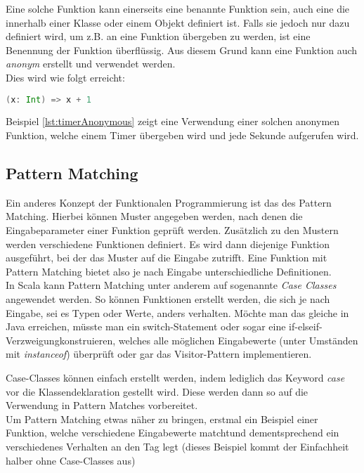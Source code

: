 Eine solche Funktion kann einerseits eine benannte Funktion sein, auch
eine die innerhalb einer Klasse oder einem Objekt definiert ist.  Falls
sie jedoch nur dazu definiert wird, um z.B. an eine Funktion übergeben
zu werden, ist eine Benennung der Funktion überflüssig. Aus diesem Grund
kann eine Funktion auch \emph{anonym} erstellt und verwendet werden.\\

Dies wird wie folgt erreicht: 

\begin{lstlisting}[float=ht,language=scala,caption=Anonyme Funktion,label=lst:anonymousFunction]
(x: Int) => x + 1
\end{lstlisting}

Beispiel \ref{lst:timerAnonymous} zeigt eine Verwendung einer solchen 
anonymen Funktion, welche einem Timer übergeben wird und jede Sekunde
aufgerufen wird. \\

\subsection{Pattern Matching}
\label{sec:patternMatching}

Ein anderes Konzept der Funktionalen Programmierung ist das des Pattern
Matching. Hierbei können Muster angegeben werden, nach denen die
Eingabeparameter einer Funktion geprüft werden. Zusätzlich zu den
Mustern werden verschiedene Funktionen definiert. Es wird dann diejenige
Funktion ausgeführt, bei der das Muster auf die Eingabe zutrifft. Eine
Funktion mit Pattern Matching bietet also je nach Eingabe unterschiedliche
Definitionen. \\

In Scala kann Pattern Matching unter anderem auf sogenannte \emph{Case
Classes} angewendet werden. So können Funktionen erstellt werden, die
sich je nach Eingabe, sei es Typen oder Werte, anders verhalten.  Möchte
man das gleiche in Java erreichen, müsste man ein switch-Statement
oder sogar eine \glqq if-elseif-Verzweigung\grqq konstruieren, welches
alle möglichen Eingabewerte (unter Umständen mit \emph{instanceof})
überprüft oder gar das Visitor-Pattern implementieren.

Case-Classes können einfach erstellt werden, indem lediglich das Keyword
\emph{case} vor die Klassendeklaration gestellt wird. Diese werden
dann so auf die Verwendung in Pattern Matches \glqq vorbereitet\grqq .\\

Um Pattern Matching etwas näher zu bringen, erstmal ein Beispiel einer
Funktion, welche verschiedene Eingabewerte \glqq matcht\grqq und dementsprechend
ein verschiedenes Verhalten an den Tag legt (dieses Beispiel kommt der 
Einfachheit halber ohne Case-Classes aus)

